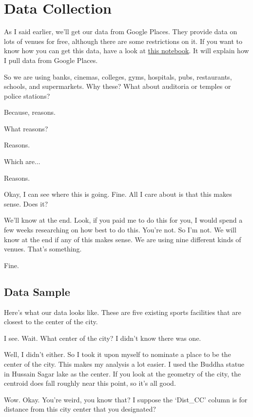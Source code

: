 \chapter{Data Collection}\label{chap:data}


As I said earlier, we'll get our data from Google Places. They provide data on lots of venues for free, although there are some restrictions on it. If you want to know how you can get this data, have a look at \href{https://github.com/saba-vadarevu/IBM-dataScience-Capstone/blob/master/final/intro_data.ipynb}{this notebook}. It will explain how I pull data from Google Places. 

{\color{blue} So we are using banks, cinemas, colleges, gyms, hospitals, pubs, restaurants, schools, and supermarkets. Why these? What about auditoria or temples or police stations?}

Because, reasons. 

{\color{blue} What reasons?}

Reasons. 

{\color{blue} Which are...}

Reasons.

{\color{blue} Okay, I can see where this is going. Fine. All I care about is that this makes sense. Does it?}

We'll know at the end. Look, if you paid me to do this for you, I would spend a few weeks researching on how best to do this. You're not. So I'm not. We will know at the end if any of this makes sense. We are using nine different kinds of venues. That's something. 

{\color{blue} Fine.}


\section{Data Sample}
Here's what our data looks like. These are five existing sports facilities that are closest to the center of the city. 



{\color{blue} I see. Wait. What center of the city? I didn't know there was one.}

Well, I didn't either. So I took it upon myself to nominate a place to be the center of the city. This makes my analysis a lot easier. I used the Buddha statue in Hussain Sagar lake as the center. If you look at the geometry of the city, the centroid does fall roughly near this point, so it's all good.

{\color{blue} Wow. Okay. You're weird, you know that? I suppose the `Dist\_CC' column is for distance from this city center that you designated? }

